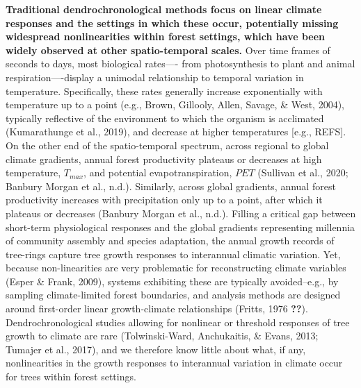 \documentclass[
]{article}
\begin{document}
\textbf{Traditional dendrochronological methods focus on linear climate
responses and the settings in which these occur, potentially missing
widespread nonlinearities within forest settings, which have been widely
observed at other spatio-temporal scales.} Over time frames of seconds
to days, most biological rates---- from photosynthesis to plant and
animal respiration----display a unimodal relationship to temporal
variation in temperature. Specifically, these rates generally increase
exponentially with temperature up to a point (e.g., Brown, Gillooly,
Allen, Savage, \& West, 2004), typically reflective of the environment
to which the organism is acclimated (Kumarathunge et al., 2019), and
decrease at higher temperatures {[}e.g., REFS{]}. On the other end of
the spatio-temporal spectrum, across regional to global climate
gradients, annual forest productivity plateaus or decreases at high
temperature, \(T_{max}\), and potential evapotranspiration, \(PET\)
(Sullivan et al., 2020; Banbury Morgan et al., n.d.). Similarly, across
global gradients, annual forest productivity increases with
precipitation only up to a point, after which it plateaus or decreases
(Banbury Morgan et al., n.d.). Filling a critical gap between short-term
physiological responses and the global gradients representing millennia
of community assembly and species adaptation, the annual growth records
of tree-rings capture tree growth responses to interannual climatic
variation. Yet, because non-linearities are very problematic for
reconstructing climate variables (Esper \& Frank, 2009), systems
exhibiting these are typically avoided--e.g., by sampling
climate-limited forest boundaries, and analysis methods are designed
around first-order linear growth-climate relationships (Fritts, 1976
\textbf{??}). Dendrochronological studies allowing for nonlinear or
threshold responses of tree growth to climate are rare (Tolwinski-Ward,
Anchukaitis, \& Evans, 2013; Tumajer et al., 2017), and we therefore
know little about what, if any, nonlinearities in the growth responses
to interannual variation in climate occur for trees within forest
settings.
\end{document}
